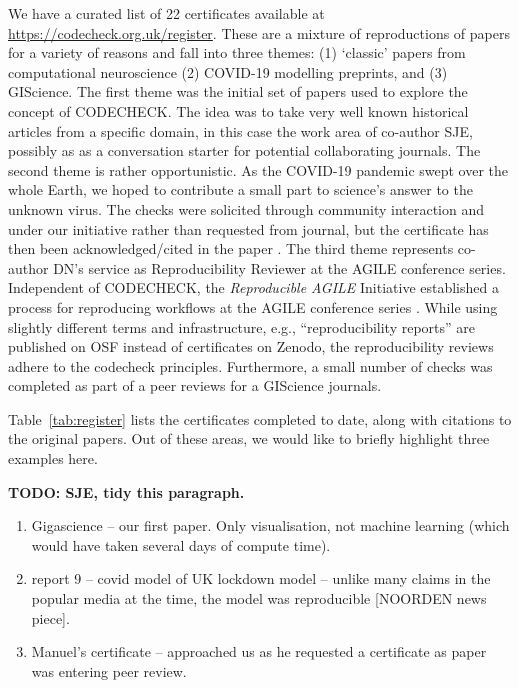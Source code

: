 \documentclass[12pt]{article}
\begin{document}
We have a curated list of 22 certificates available at
\url{https://codecheck.org.uk/register}. These are a mixture of
reproductions of papers for a variety of reasons and fall into three themes:
(1) `classic' papers from computational neuroscience
(2) COVID-19 modelling preprints, and
(3) GIScience.  
The first theme was the initial set of papers used to explore the concept
of CODECHECK. The idea was to take very well known historical articles from a 
specific domain, in this case the work area of co-author SJE, possibly 
as as a conversation starter for potential collaborating journals.
The second theme is rather opportunistic. As the COVID-19 pandemic swept
over the whole Earth, we hoped to contribute a small part to science's answer
to the unknown virus. The checks were solicited through community interaction
and under our initiative rather than requested from journal, but the certificate
has then been acknowledged/cited in the paper \cite{Davies2020-vj}.
The third theme represents co-author DN's service as Reproducibility
Reviewer at the AGILE conference series.
Independent of CODECHECK, the \emph{Reproducible AGILE} Initiative \cite{reproducible_agile}
established a process for reproducing workflows at the AGILE conference
series \cite{nust_improving_2020}.
While using slightly different terms and infrastructure, e.g., ``reproducibility
reports'' are published on OSF instead of certificates on Zenodo, the 
reproducibility reviews adhere to the codecheck principles.
Furthermore, a small number of checks was completed as part of a peer reviews
for a GIScience journals.

Table~\ref{tab:register} lists the certificates completed to date,
along with citations to the original papers.
Out of these areas, we would like to briefly highlight three examples here.


\textbf{TODO: SJE, tidy this paragraph.}
\begin{enumerate}
\def\labelenumi{\arabic{enumi}.}
\item
  Gigascience -- our first paper.  Only visualisation, not machine
  learning (which would have taken several days of compute time).
\item
  report 9 -- covid model of UK lockdown model -- unlike many claims
  in the popular media at the time, the model was reproducible
  [NOORDEN news piece]. 
\item
  Manuel's certificate -- approached us as he requested a certificate
  as paper was entering peer review.
\end{enumerate}
\end{document}
